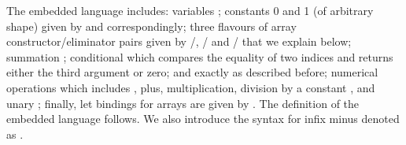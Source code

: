 The embedded language  includes: variables ; constants 0 and 1
(of arbitrary shape) given by  and  correspondingly; three
flavours of array constructor/eliminator pairs given by /,
/ and / that we explain below;
summation ; conditional
 which compares the equality of two indices and returns either
the third argument or zero;  and  exactly as described before;
numerical operations which includes , plus,
multiplication, division by a constant , and unary ;
finally, let bindings for arrays are given by .
The definition of the embedded language  follows. We also introduce 
the syntax for infix minus denoted as .
